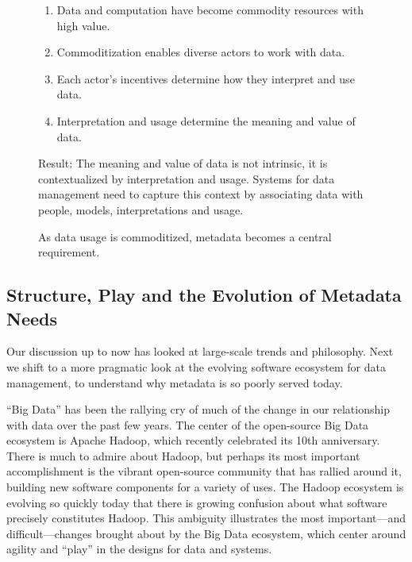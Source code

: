 \documentclass[10pt,letterpaper]{article}
\begin{document}
\begin{figure*}[t]
\begin{centering}
\begin{tcolorbox}[width=0.75\linewidth]
\begin{enumerate}
\item Data and computation have become commodity resources with high value.
\item Commoditization enables diverse actors to work with data.
\item Each actor's incentives determine how they interpret and use data.
\item Interpretation and usage determine the meaning and value of data.
\end{enumerate}
Result: The meaning and value of data is not intrinsic, it is contextualized by interpretation and usage. Systems for data management need to capture this context by associating data with people, models, interpretations and usage. 
\end{tcolorbox}
\end{centering}
\caption{As data usage is commoditized, metadata becomes a central requirement.}
\label{fig:syllogism}
\end{figure*}



\subsection{Structure, Play and the Evolution of Metadata Needs}
Our discussion up to now has looked at large-scale trends and philosophy.  Next we shift to a more pragmatic look at the evolving software ecosystem for data management, to understand why metadata is so poorly served today.

``Big Data'' has been the rallying cry of much of the change in our relationship with data over the past few years.  
The center of the open-source Big Data ecosystem is Apache Hadoop, which recently celebrated its 10th anniversary.  There is much to admire about Hadoop, but perhaps its most important accomplishment is the vibrant open-source community that has rallied around it, building new software components for a variety of uses. The Hadoop ecosystem is evolving so quickly today that there is growing confusion about what software precisely constitutes Hadoop.  This ambiguity illustrates the most important---and difficult---changes brought about by the Big Data ecosystem, which center around agility and ``play'' in the designs for data and systems.  
\end{document}
